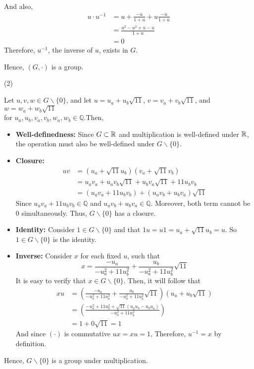 \documentclass{report}
\newcommand{\noZ}[1]{#1 \backslash \{0\}}
\begin{document}
{\begin{shift}
\begin{itemize}
        And also, 
        \begin{align*}
          u \cdot u^{-1} &= u + \frac{-u}{1+u} + u\frac{-u}{1+u}
                      \\ &= \frac{u^2 - u^2 + u - u}{1+u}
                      \\ &= 0
        \end{align*}
        Therefore, $u^{-1}$, the inverse of $u$, exists in $G$. 
      \end{itemize}
      Hence, $(G, \cdot)$ is a group. 
    \end{shift} 
    (2) 
    \begin{shift}
      Let $u, v, w \in \noZ{G}$, and let $u = u_a + u_b\sqrt{11}$, $v = v_a + v_b\sqrt{11}$, and $w = w_a + w_b\sqrt{11}$ \\ 
      for $u_a, u_b, v_a, v_b, w_a, w_b \in \mathbb{Q} $.Then,
      \begin{itemize}
        \item \textbf{Well-definedness: } Since $G \subset \mathbb{R}$ and multiplication is well-defined under $\mathbb{R}$, the operation must also be well-defined under $\noZ{G}$.  
        \item \textbf{Closure: } 
        \begin{align*}
          uv &= (u_a + \sqrt{11}u_b)(v_a + \sqrt{11}v_b)
          \\ &= u_a v_a + u_a v_b \sqrt{11} + u_b v_a \sqrt{11} + 11 u_b v_b 
          \\ &= (u_a v_a + 11 u_b v_b) + (u_a v_b + u_b v_a)\sqrt{11}
        \end{align*}
        Since $u_a v_a + 11 u_b v_b \in \mathbb{Q}$ and $u_a v_b + u_b v_a \in \mathbb{Q}$. Moreover, both term cannot be $0$ simultaneously. Thus, $\noZ{G}$ has a closure. 
        \item \textbf{Identity: } Consider $1 \in \noZ{G}$ and that $1u = u1 = u_a + \sqrt{11}u_b = u$. So $1 \in \noZ{G}$ is the identity.
        \item \textbf{Inverse: } Consider $x$ for each fixed $u$, such that \[x = \frac{-u_a}{-u_a^2 + 11 u_b^2} + \frac{u_b}{-u_a^2 + 11 u_b^2}\sqrt{11}\]
        It is easy to verify that $x \in \noZ{G}$. Then, it will follow that 
        \begin{align*}
          xu &= \left(\frac{-u_a}{-u_a^2 + 11 u_b^2} + \frac{u_b}{-u_a^2 + 11 u_b^2}\sqrt{11}\right) (u_a + u_b\sqrt{11})
          \\ &= \left(\frac{-u_a^2 + 11 u_b^2 + \sqrt{11}(u_a u_b - u_b u_a)}{-u_a^2 + 11u_b^2}\right) 
          \\ &= 1 + 0\sqrt{11} = 1
        \end{align*}
        And since $(\cdot)$ is commutative $ux = xu = 1$, Therefore, $u^{-1} = x$ by definition. 
      \end{itemize}
      Hence, $\noZ{G}$ is a group under multiplication.
    \end{shift} 
  }
\end{document}
